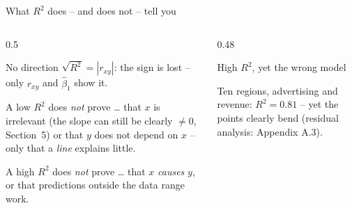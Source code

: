 \documentclass[aspectratio=169,11pt]{beamer}
\newcommand{\saturpoints}{\addplot[only marks, mark=*, mark size=2.2pt, color=hsbiblau]
  coordinates {(1,25) (2,32) (3,37) (4,41) (5,44) (6,46) (7,47) (8,48) (9,48) (10,47)};}
\begin{document}
\begin{frame}{What $R^{2}$ does -- and does not -- tell you}
  \begin{columns}[T]
    \begin{column}{0.5\textwidth}
      \small
      \begin{block}{No direction}
        $\sqrt{R^{2}} = |r_{xy}|$: the sign is lost -- only $r_{xy}$ and
        $\hat{\beta}_1$ show it.
      \end{block}
      \begin{block}{A low $R^2$ does \emph{not} prove \ldots}
        that $x$ is irrelevant (the slope can still be clearly $\neq 0$,
        Section~5) or that $y$ does not depend on $x$ -- only that a
        \emph{line} explains little.
      \end{block}
      \begin{block}{A high $R^2$ does \emph{not} prove \ldots}
        that $x$ \emph{causes} $y$, or that predictions outside the data
        range work.
      \end{block}
    \end{column}
    \begin{column}{0.48\textwidth}
      \small
      \begin{alertblock}{High $R^{2}$, yet the wrong model}
        \begin{center}
        \end{center}
        Ten regions, advertising and revenue: $R^{2} = 0.81$ -- yet the points
        clearly bend (residual analysis: Appendix A.3).
      \end{alertblock}
    \end{column}
  \end{columns}
\end{frame}
\end{document}
